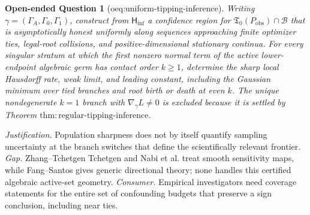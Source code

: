 \documentclass{article}
\newtheorem{openendedquestion}{Open-ended Question}
\begin{document}
\begin{openendedquestion}[oeq:uniform-tipping-inference]\label{oeq:uniform-tipping-inference}
Writing \(\gamma=(\Gamma_A,\Gamma_0,\Gamma_1)\), construct from \(\mathsf H_{\mathrm{inf}}\) a confidence region for \(\mathfrak T_0(P_{\mathrm{obs}})\cap\mathcal B\) that is asymptotically honest uniformly along sequences approaching finite optimizer ties, legal-root collisions, and positive-dimensional stationary continua.  For every singular stratum at which the first nonzero normal term of the active lower-endpoint algebraic germ has contact order \(k\geq1\), determine the sharp local Hausdorff rate, weak limit, and leading constant, including the Gaussian minimum over tied branches and root birth or death at even \(k\).  The unique nondegenerate \(k=1\) branch with \(\nabla_\gamma L\neq0\) is excluded because it is settled by Theorem \(\mathrm{thm{:}regular\text{-}tipping\text{-}inference}\).
\end{openendedquestion}
\par\smallskip\noindent \textit{Justification.} Population sharpness does not by itself quantify sampling uncertainty at the branch switches that define the scientifically relevant frontier. \textit{Gap.} Zhang--Tchetgen Tchetgen and Nabi et al. treat smooth sensitivity maps, while Fang--Santos gives generic directional theory; none handles this certified algebraic active-set geometry. \textit{Consumer.} Empirical investigators need coverage statements for the entire set of confounding budgets that preserve a sign conclusion, including near ties.
\end{document}
